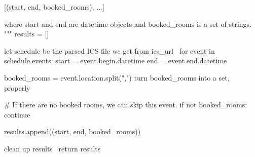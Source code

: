   [(start, end, booked_rooms), ...]

  where start and end are datetime objects and booked_rooms is a set of 
  strings.
  """
  results = []

  \LA{}let \code{}schedule\edoc{} be the parsed ICS file we get from \code{}ics{\_}url\edoc{}~{\nwtagstyle{}}\RA{}
  for event in schedule.events:
    start = event.begin.datetime
    end = event.end.datetime

    booked_rooms = event.location.split(",")
    \LA{}turn \code{}booked{\_}rooms\edoc{} into a set, properly~{\nwtagstyle{}}\RA{}

    # If there are no booked rooms, we can skip this event.
    if not booked_rooms:
      continue

    results.append((start, end, booked_rooms))

  \LA{}clean up \code{}results\edoc{}~{\nwtagstyle{}}\RA{}
  return results
\nwendcode{}
